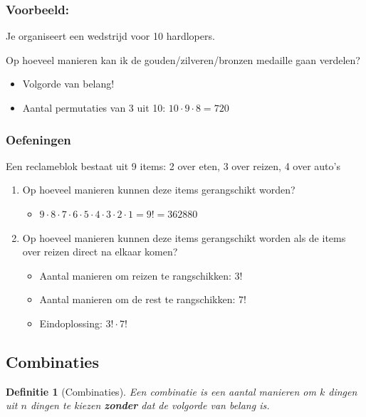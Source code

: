 \documentclass{article}
\newtheorem{theorem}{Definitie}[section]
\begin{document}
\subsubsection{Voorbeeld:} 

Je organiseert een wedstrijd voor 10 hardlopers. 

Op hoeveel manieren kan ik de gouden/zilveren/bronzen medaille gaan verdelen?

\begin{itemize}
    \item Volgorde van belang!
    \item Aantal permutaties van 3 uit 10: $10 \cdot 9 \cdot 8 = 720$
\end{itemize}

\subsubsection{Oefeningen}

Een reclameblok bestaat uit 9 items: 2 over eten, 3 over reizen, 4 over auto's

\begin{enumerate}
    \item Op hoeveel manieren kunnen deze items gerangschikt worden?
    \begin{itemize}
        \item $9 \cdot 8 \cdot 7 \cdot 6 \cdot 5 \cdot 4 \cdot 3 \cdot 2 \cdot 1 = 9! = 362880$
    \end{itemize}
    \item Op hoeveel manieren kunnen deze items gerangschikt worden als de items over reizen direct na elkaar komen?
    \begin{itemize}
        \item Aantal manieren om reizen te rangschikken: $3!$
        \item Aantal manieren om de rest te rangschikken: $7!$
        \item Eindoplossing: $3! \cdot 7!$
    \end{itemize}
\end{enumerate}

\subsection{Combinaties}

\begin{theorem}[Combinaties]
    Een combinatie is een aantal manieren om $k$ dingen uit $n$ dingen te kiezen \textbf{zonder} dat de volgorde van belang is.
\end{theorem}
\end{document}
